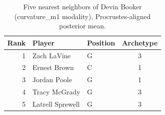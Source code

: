 \begin{table}[htbp]
  \centering\small
  \begin{tabular}{rllc}
    \toprule
    Rank & Player & Position & Archetype \\
    \midrule
    1 & Zach LaVine & G & 3 \\
    2 & Ernest Brown & C & 1 \\
    3 & Jordan Poole & G & 1 \\
    4 & Tracy McGrady & G & 3 \\
    5 & Latrell Sprewell & G & 3 \\
    \bottomrule
  \end{tabular}
  \caption{Five nearest neighbors of Devin Booker (curvature_m1 modality), Procrustes-aligned posterior mean.}
  \label{tab:Devin_Booker_neighbors_curvature_m1}
\end{table}


